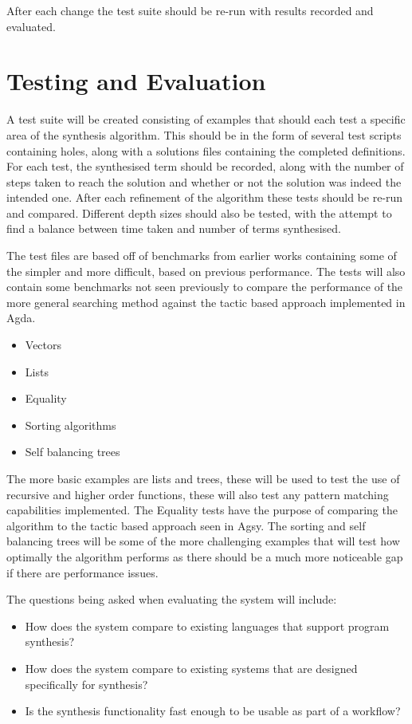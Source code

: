 \documentclass[a4paper]{article}
\begin{document}
After each change the test suite should be re-run with results recorded and evaluated.

\section{Testing and Evaluation}
\label{sec:org4043759}

A test suite will be created consisting of examples that should each test a specific area of the synthesis algorithm. 
This should be in the form of several test scripts containing holes, along with a solutions files containing the 
completed definitions. For each test, the synthesised term should be recorded, along with the number of steps 
taken to reach the solution and whether or not the solution was indeed the intended one. After each refinement of the 
algorithm these tests should be re-run and compared. Different depth sizes should also be tested, with the attempt
to find a balance between time taken and number of terms synthesised.  

The test files are based off of benchmarks from earlier works containing some of the simpler and more 
difficult, based on previous performance. The tests will also contain some benchmarks not seen previously to compare the
performance of the more general searching method against the tactic based approach implemented in Agda.   

\begin{itemize}
\item Vectors
\item Lists
\item Equality
\item Sorting algorithms
\item Self balancing trees
\end{itemize}

The more basic examples are lists and trees, these will be used to test the use of recursive and higher order 
functions, these will also test any pattern matching capabilities implemented. The Equality tests have the purpose of 
comparing the algorithm to the tactic based approach seen in Agsy. The sorting and self balancing trees will be some of the 
more challenging examples that will test how optimally the algorithm performs as there should be a much more noticeable 
gap if there are performance issues. 

The questions being asked when evaluating the system will include: 

\begin{itemize}
\item How does the system compare to existing languages that support program synthesis?
\item How does the system compare to existing systems that are designed specifically for synthesis?
\item Is the synthesis functionality fast enough to be usable as part of a workflow?
\end{itemize}
\end{document}
